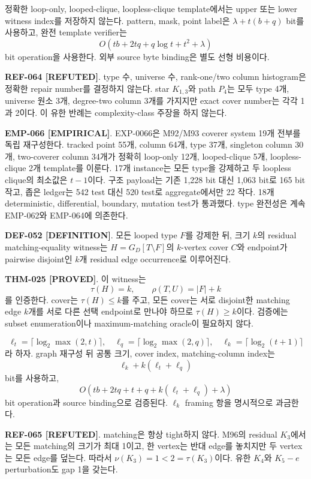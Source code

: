 \documentclass[11pt]{article}
\newcommand{\claimstatus}[2]{\textbf{#1 [#2]}}
\begin{document}
정확한 loop-only, looped-clique, loopless-clique template에서는 upper
또는 lower witness index를 저장하지 않는다. pattern, mask, point
label은 \(\lambda+t(b+q)\) bit를 사용하고, 완전 template verifier는
\[
 O(tb+2tq+q\log t+t^2+\lambda)
\]
bit operation을 사용한다. 외부 source byte binding은 별도 선형
비용이다.

\claimstatus{REF-064}{REFUTED}.
type 수, universe 수, rank-one/two column histogram은 정확한 repair
number를 결정하지 않는다. star \(K_{1,3}\)와 path \(P_4\)는 모두
type 4개, universe 원소 3개, degree-two column 3개를 가지지만 exact
cover number는 각각 1과 2이다. 이 유한 반례는 complexity-class
주장을 하지 않는다.

\claimstatus{EMP-066}{EMPIRICAL}.
EXP-0066은 M92/M93 coverer system 19개 전부를 독립 재구성한다.
tracked point 55개, column 64개, type 37개, singleton column 30개,
two-coverer column 34개가 정확히 loop-only 12개, looped-clique 5개,
loopless-clique 2개 template를 이룬다. 17개 instance는 모든 type을
강제하고 두 loopless clique의 최소값은 \(t-1\)이다. 구조 payload는
기존 1,228 bit 대신 1,063 bit로 165 bit 작고, 좁은 ledger는 542
test 대신 520 test로 aggregate에서만 22 작다. 18개 deterministic,
differential, boundary, mutation test가 통과했다. type 완전성은 계속
EMP-062와 EMP-064에 의존한다.

\claimstatus{DEF-052}{DEFINITION}.
모든 looped type \(F\)를 강제한 뒤, 크기 \(k\)의 residual
matching-equality witness는 \(H=G_D[T\setminus F]\)의 \(k\)-vertex
cover \(C\)와 endpoint가 pairwise disjoint인 \(k\)개 residual edge
occurrence로 이루어진다.

\claimstatus{THM-025}{PROVED}. 이 witness는
\[
 \tau(H)=k,\qquad \rho(T,U)=|F|+k
\]
를 인증한다. cover는 \(\tau(H)\le k\)를 주고, 모든 cover는 서로
disjoint한 matching edge \(k\)개를 서로 다른 선택 endpoint로 만나야
하므로 \(\tau(H)\ge k\)이다. 검증에는 subset enumeration이나
maximum-matching oracle이 필요하지 않다.

\[
 \ell_t=\lceil\log_2\max(2,t)\rceil,\quad
 \ell_q=\lceil\log_2\max(2,q)\rceil,\quad
 \ell_k=\lceil\log_2(t+1)\rceil
\]
라 하자. graph 재구성 뒤 공통 크기, cover index, matching-column
index는
\[
 \ell_k+k(\ell_t+\ell_q)
\]
bit를 사용하고,
\[
 O(tb+2tq+t+q+k(\ell_t+\ell_q)+\lambda)
\]
bit operation과 source binding으로 검증된다. \(\ell_k\) framing 항을
명시적으로 과금한다.

\claimstatus{REF-065}{REFUTED}. matching은 항상 tight하지 않다. M96의
residual \(K_3\)에서는 모든 matching의 크기가 최대 1이고, 한 vertex는
반대 edge를 놓치지만 두 vertex는 모든 edge를 덮는다. 따라서
\(\nu(K_3)=1<2=\tau(K_3)\)이다. 유한 \(K_4\)와 \(K_5-e\)
perturbation도 gap 1을 갖는다.
\end{document}

